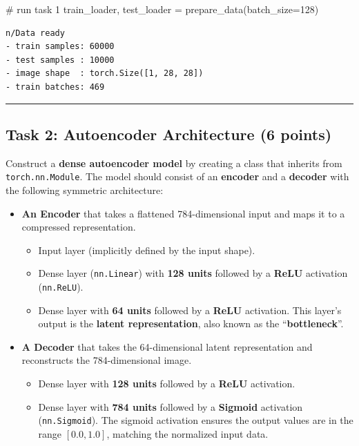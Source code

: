 \documentclass[
  letterpaper,
  DIV=11,
  numbers=noendperiod]{scrartcl}
\newenvironment{Shaded}{\begin{snugshade}}{\end{snugshade}}
\newcommand{\CommentTok}[1]{\textcolor[rgb]{0.37,0.37,0.37}{#1}}
\newcommand{\DecValTok}[1]{\textcolor[rgb]{0.68,0.00,0.00}{#1}}
\newcommand{\NormalTok}[1]{\textcolor[rgb]{0.00,0.23,0.31}{#1}}
\newcommand{\OperatorTok}[1]{\textcolor[rgb]{0.37,0.37,0.37}{#1}}
\providecommand{\tightlist}{%
  \setlength{\itemsep}{0pt}\setlength{\parskip}{0pt}}\usepackage{longtable,booktabs,array}
\begin{document}
\begin{Shaded}
\begin{Highlighting}[]
\CommentTok{\# run task 1}
\NormalTok{train\_loader, test\_loader }\OperatorTok{=}\NormalTok{ prepare\_data(batch\_size}\OperatorTok{=}\DecValTok{128}\NormalTok{)}
\end{Highlighting}
\end{Shaded}

\label{task1}
\begin{verbatim}
n/Data ready
- train samples: 60000
- test samples : 10000
- image shape  : torch.Size([1, 28, 28])
- train batches: 469
\end{verbatim}

\begin{center}\rule{0.5\linewidth}{0.5pt}\end{center}

\subsection{Task 2: Autoencoder Architecture (6
points)}\label{task-2-autoencoder-architecture-6-points}

Construct a \textbf{dense autoencoder model} by creating a class that
inherits from \texttt{torch.nn.Module}. The model should consist of an
\textbf{encoder} and a \textbf{decoder} with the following symmetric
architecture:

\begin{itemize}
\item
  \textbf{An Encoder} that takes a flattened 784-dimensional input and
  maps it to a compressed representation.

  \begin{itemize}
  \tightlist
  \item
    Input layer (implicitly defined by the input shape).
  \item
    Dense layer (\texttt{nn.Linear}) with \textbf{128 units} followed by
    a \textbf{ReLU} activation (\texttt{nn.ReLU}).
  \item
    Dense layer with \textbf{64 units} followed by a \textbf{ReLU}
    activation. This layer's output is the \textbf{latent
    representation}, also known as the ``\textbf{bottleneck}''.
  \end{itemize}
\item
  \textbf{A Decoder} that takes the 64-dimensional latent representation
  and reconstructs the 784-dimensional image.

  \begin{itemize}
  \tightlist
  \item
    Dense layer with \textbf{128 units} followed by a \textbf{ReLU}
    activation.
  \item
    Dense layer with \textbf{784 units} followed by a \textbf{Sigmoid}
    activation (\texttt{nn.Sigmoid}). The sigmoid activation ensures the
    output values are in the range \([0.0, 1.0]\), matching the
    normalized input data.
  \end{itemize}
\end{itemize}
\end{document}
